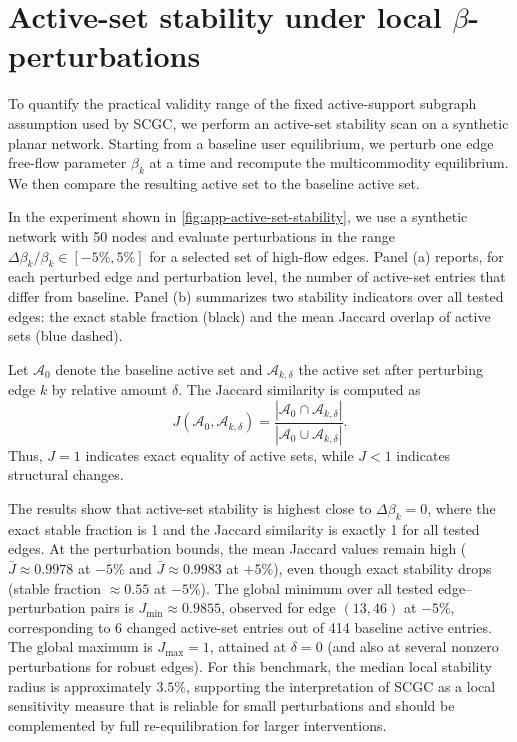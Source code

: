 \documentclass[twocolumn,english,groupedaddress, superscriptaddress,aps,pre,10pt,floatfix]{revtex4-2}
\begin{document}
\section{Active-set stability under local $\beta$-perturbations}\label{app:active-set-stability}
To quantify the practical validity range of the fixed active-support subgraph assumption used by SCGC, we perform an active-set stability scan on a synthetic planar network. Starting from a baseline user equilibrium, we perturb one edge free-flow parameter $\beta_k$ at a time and recompute the multicommodity equilibrium. We then compare the resulting active set to the baseline active set.

In the experiment shown in \cref{fig:app-active-set-stability}, we use a synthetic network with 50 nodes and evaluate perturbations in the range $\Delta \beta_k/\beta_k \in [-5\%, 5\%]$ for a selected set of high-flow edges. Panel (a) reports, for each perturbed edge and perturbation level, the number of active-set entries that differ from baseline. Panel (b) summarizes two stability indicators over all tested edges: the exact stable fraction (black) and the mean Jaccard overlap of active sets (blue dashed).

Let $\mathcal{A}_0$ denote the baseline active set and $\mathcal{A}_{k,\delta}$ the active set after perturbing edge $k$ by relative amount $\delta$. The Jaccard similarity is computed as
\begin{equation}
J(\mathcal{A}_0,\mathcal{A}_{k,\delta})=\frac{|\mathcal{A}_0\cap \mathcal{A}_{k,\delta}|}{|\mathcal{A}_0\cup \mathcal{A}_{k,\delta}|}.
\end{equation}
Thus, $J=1$ indicates exact equality of active sets, while $J<1$ indicates structural changes.

The results show that active-set stability is highest close to $\Delta\beta_k=0$, where the exact stable fraction is 1 and the Jaccard similarity is exactly 1 for all tested edges. At the perturbation bounds, the mean Jaccard values remain high ($\bar J\approx 0.9978$ at $-5\%$ and $\bar J\approx 0.9983$ at $+5\%$), even though exact stability drops (stable fraction $\approx 0.55$ at $-5\%$). The global minimum over all tested edge--perturbation pairs is $J_{\min}\approx 0.9855$, observed for edge $(13,46)$ at $-5\%$, corresponding to 6 changed active-set entries out of 414 baseline active entries. The global maximum is $J_{\max}=1$, attained at $\delta=0$ (and also at several nonzero perturbations for robust edges). For this benchmark, the median local stability radius is approximately $3.5\%$, supporting the interpretation of SCGC as a local sensitivity measure that is reliable for small perturbations and should be complemented by full re-equilibration for larger interventions.
\end{document}
